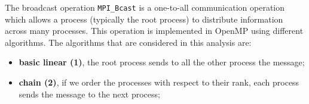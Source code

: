The broadcast operation \texttt{MPI\_Bcast} is a one-to-all communication operation which allows a process (typically the root process) to distribute information across many processes. This operation is implemented in OpenMP using different algorithms. The algorithms that are considered in this analysis are:
\begin{itemize}
    \item \textbf{basic linear (1)}, the root process sends to all the other process the message;
    \begin{center}
    \end{center}

    \item \textbf{chain (2)}, if we order the processes with respect to their rank, each process sends the message to the next process;
    
    \begin{center}
    \end{center}


\end{itemize}
